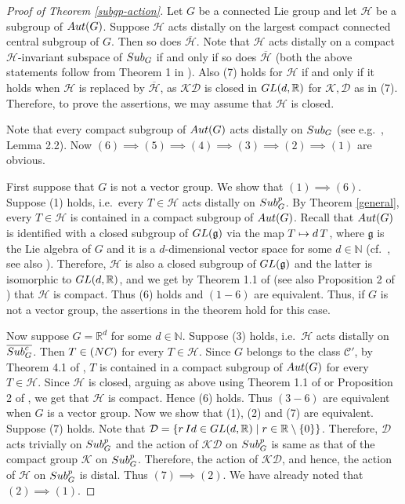 \documentclass{amsart}
\numberwithin{equation}{section}
\newcommand{\Aut}{{\rm Aut}}
\newcommand{\Sub}{{\rm Sub}}
\newcommand{\N}{{\mathbb N}}
\newcommand{\R}{{\mathbb R}}
\newcommand{\gf}{{\mathfrak g}}
\newcommand{\Hc}{{\mathcal H}}
\newcommand{\K}{{\mathcal K}}
\newcommand{\D}{{\mathcal D}}
\newcommand{\spg}{{\rm Sub}^p_G}
\newcommand{\du}{{\rm d\,}}
\newcommand{\Id}{{\rm Id}}
\newcommand{\GL}{{\rm GL}}
\let\ol=\overline
\let\mi=\setminus
\theoremstyle{remark}
\newcommand{\cp}{{\mathcal{C}'}}
\begin{document}
\begin{proof}[Proof of Theorem \ref{subgp-action}] Let $G$ be a connected Lie group and let $\Hc$ 
be a subgroup of $\Aut(G)$. Suppose $\Hc$ acts distally on the largest compact connected central 
subgroup of $G$. Then so does $\ol{\Hc}$. Note that 
$\Hc$ acts distally on a compact $\Hc$-invariant subspace of $\Sub_G$ if and only if so does $\ol{\Hc}$ 
(both the above statements follow from Theorem 1 in \cite{E}). Also (7) holds for $\Hc$ if and only if it holds  
when $\Hc$ is replaced by $\ol{\Hc}$, as $\K\D$ is closed in $\GL(d,\R)$ for $\K,\D$ as in (7).  
Therefore, to prove the assertions, we may assume that $\Hc$ is closed. 

Note that every compact subgroup of $\Aut(G)$ acts distally on $\Sub_G$ (see e.g.\ \cite{SY2}, Lemma 2.2). 
Now $(6)\implies (5)\implies (4)\implies (3)\implies (2)\implies (1)$ are obvious. 

First suppose that $G$ is not a vector group. We show that $(1)\implies (6)$. 
Suppose (1) holds, i.e.\ every $T\in \Hc$ acts distally on $\spg$. By Theorem \ref{general}, 
every $T\in \Hc$ is contained in a compact subgroup of $\Aut(G)$. Recall that $\Aut(G)$ is identified 
with a closed subgroup of $\GL(\gf)$ via the map $T\mapsto\du T$, where $\gf$ is the Lie algebra of $G$ 
and it is a $d$-dimensional vector space for some $d\in\N$  (cf.\ \cite{Ch}, see also \cite{Hoc}). 
Therefore, $\Hc$ is also a closed subgroup of $\GL(\gf)$ and the latter is isomorphic to $\GL(d,\R)$, 
and we get by Theorem 1.1 of \cite{FP} (see also Proposition 2 of \cite{SY1}) that $\Hc$ is compact. 
Thus (6) holds and $(1-6)$ are equivalent. 
Thus, if $G$ is not a vector group, the assertions in the theorem hold for this case.  
 
Now suppose $G=\R^d$ for some $d\in\N$. Suppose (3) holds, i.e.\ $\Hc$ acts distally on $\ol{\Sub^c_G}$. 
Then $T\in\rm{(NC)}$ for every $T\in\Hc$. Since $G$ belongs to the class $\cp$, by Theorem 4.1 of \cite{SY3}, 
$T$ is contained in a compact subgroup of $\Aut(G)$ for every $T\in\Hc$. Since $\Hc$ is closed, arguing as 
above using Theorem 1.1 of \cite{FP} or Proposition 2 of \cite{SY1}, we get that $\Hc$ is compact. Hence
(6) holds. Thus $(3-6)$ are equivalent when $G$ is a vector group. 
Now we show that (1), (2) and (7) are equivalent. Suppose (7) holds. Note that 
$\D=\{r\,\Id\in\GL(d,\R)\mid r\in\R\mi\{0\}\}$. 
Therefore, $\D$ acts trivially on $\spg$ and the action of $\K\D$ on $\spg$ is same as that 
of the compact group $\K$ on $\spg$. Therefore, the action of $\K\D$, and hence, the action of 
$\Hc$ on $\spg$ is distal. Thus $(7)\implies (2)$. We have already noted that $(2)\implies (1)$. 


\end{proof}
\end{document}
